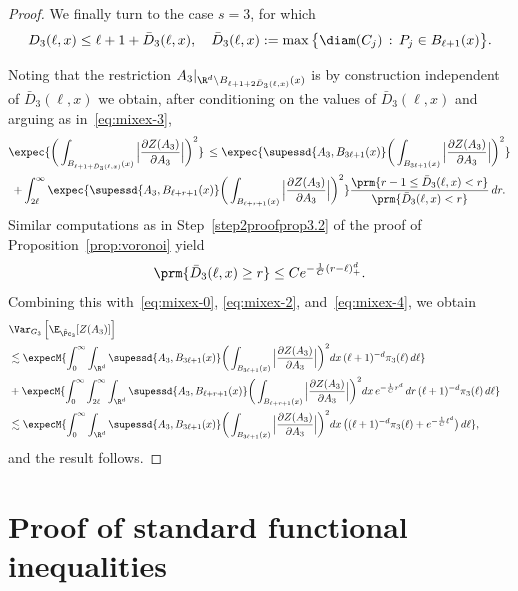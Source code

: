\begin{proof}
\noindent We finally turn to the case $s=3$, for which
\[
D_3(\ell,x)\le\ell+1+\bar D_3(\ell,x),\quad \bar D_3(\ell,x):=\max\big\{\diam(C_j)\,:\,P_j\in B_{\ell+1}(x)\big\}.
\]

Noting that the restriction $A_3|_{\R^d\setminus B_{\ell+1+2\bar D_3(\ell,x)}(x)}$ is by construction independent of $\bar D_3(\ell,x)$ we obtain, after conditioning on the values of $\bar D_3(\ell,x)$ and arguing as in~\eqref{eq:mixex-3},
\begin{multline}\label{eq:mixex-4}
{\expec{\bigg(\int_{B_{\ell+1+\bar D_3(\ell,x)}(x)}\Big|\frac{\partial Z(A_3)}{\partial A_3}\Big|\bigg)^2}}\,
\le \expec{\supessd{A_3,B_{3\ell+1}(x)}\bigg(\int_{B_{3\ell+1}(x)}\Big|\frac{\partial Z(A_3)}{\partial A_3}\Big|\bigg)^2}
\\+\int_{2\ell}^\infty\expec{\supessd{A_3,B_{\ell+r+1}(x)}\bigg(\int_{B_{\ell+r+1}(x)}\Big|\frac{\partial Z(A_3)}{\partial A_3}\Big|\bigg)^2}\frac{\prm{r-1\le\bar D_3(\ell,x)<r}}{\prm{\bar D_3(\ell,x)<r}}\,dr.
\end{multline}
Similar computations as in Step~\ref{step2proofprop3.2} of the proof of Proposition~\ref{prop:voronoi} yield
\[
\prm{\bar D_3(\ell,x)\ge r}\le Ce^{-\frac1C(r-\ell)_+^d}.
\]
Combining this with~\eqref{eq:mixex-0}, \eqref{eq:mixex-2}, and~\eqref{eq:mixex-4}, we obtain
\begin{align*}
\lefteqn{\Var_{G_3}\left[\E_{\hat\Pc_3}[Z(A_3)]\right]}\\
&\lesssim \expecM{\int_0^\infty \int_{\R^d}\supessd{A_3,B_{3\ell+1}(x)}\bigg(\int_{B_{3\ell+1}(x)}\Big|\frac{\partial Z(A_3)}{\partial A_3}\Big|\bigg)^2dx\,(\ell+1)^{-d}\pi_3(\ell)\,d\ell}\\
&+\expecM{\int_0^\infty\int_{2\ell}^\infty \int_{\R^d}\supessd{A_3,B_{\ell+r+1}(x)}\bigg(\int_{B_{\ell+r+1}(x)}\Big|\frac{\partial Z(A_3)}{\partial A_3}\Big|\bigg)^2dx\,e^{-\frac1Cr^d}\,dr\,(\ell+1)^{-d}\pi_3(\ell)\,d\ell}\\
&\lesssim \expecM{\int_0^\infty \int_{\R^d}\supessd{A_3,B_{3\ell+1}(x)}\bigg(\int_{B_{3\ell+1}(x)}\Big|\frac{\partial Z(A_3)}{\partial A_3}\Big|\bigg)^2dx\,\big((\ell+1)^{-d}\pi_3(\ell)+e^{-\frac1C\ell^d}\big)\,d\ell},
\end{align*}
and the result follows.
\end{proof}




\appendix

\section{Proof of standard functional inequalities}\label{sec:appendA}

